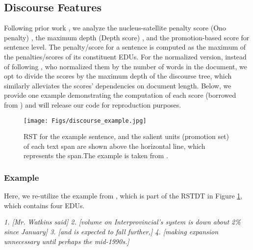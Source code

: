 
\subsection{Discourse Features}
\label{appendix:disocurse_feature_details}

Following prior work \cite{louis-etal-2010-discourse}, we analyze the nucleus-satellite penalty score (Ono penalty) \cite{ono-etal-1994-abstract}, the maximum depth (Depth score) \cite{Marcu1998tobuild}, and the promotion-based score \cite{Marcu1998tobuild} for sentence level. The penalty/score for
a sentence is computed as the maximum of the
penalties/scores of its constituent EDUs.
For the normalized version, instead of following \citet{louis-etal-2010-discourse}, who normalized them by the number of words in the
document, we opt to divide the scores by the maximum depth of the discourse tree, which similarly alleviates the scores' dependencies on document length. Below, we provide one example demonstrating the computation of each score (borrowed from \citet{louis-etal-2010-discourse}) and will release our code for reproduction purposes.

\begin{figure}[t!]
    \centering
    \texttt{[image: Figs/discourse\_example.jpg]}
    \caption{RST for the example sentence, and the salient units (promotion
set) of each text span are shown above the horizontal line, which represents the span.The example is taken from \citet{louis-etal-2010-discourse}.}
    \label{fig:discourse_example}
\end{figure}

\subsubsection{Example}
Here, we re-utilize the example from \citet{louis-etal-2010-discourse}, which is part of the RSTDT \cite{carlson2002rst} in Figure \ref{fig:discourse_example}, which contains four EDUs.

\textit{1. [Mr. Watkins said] 2. [volume on Interprovincial’s system is down about 2\% since January] 3. [and is expected to
fall further,] 4. [making expansion unnecessary until perhaps
the mid-1990s.]} 
